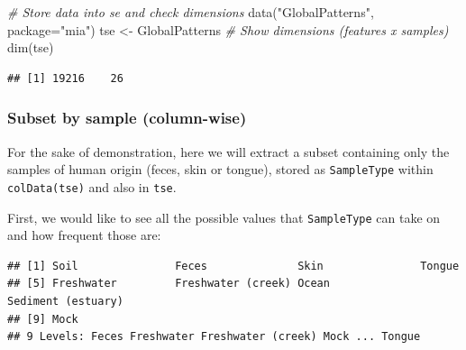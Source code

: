 \documentclass[
]{book}
\newenvironment{Shaded}{\begin{snugshade}}{\end{snugshade}}
\newcommand{\AttributeTok}[1]{\textcolor[rgb]{0.77,0.63,0.00}{#1}}
\newcommand{\CommentTok}[1]{\textcolor[rgb]{0.56,0.35,0.01}{\textit{#1}}}
\newcommand{\FunctionTok}[1]{\textcolor[rgb]{0.00,0.00,0.00}{#1}}
\newcommand{\NormalTok}[1]{#1}
\newcommand{\OtherTok}[1]{\textcolor[rgb]{0.56,0.35,0.01}{#1}}
\newcommand{\SpecialCharTok}[1]{\textcolor[rgb]{0.00,0.00,0.00}{#1}}
\newcommand{\StringTok}[1]{\textcolor[rgb]{0.31,0.60,0.02}{#1}}
\begin{document}
\begin{Shaded}
\begin{Highlighting}[]
\CommentTok{\# Store data into se and check dimensions}
\FunctionTok{data}\NormalTok{(}\StringTok{"GlobalPatterns"}\NormalTok{, }\AttributeTok{package=}\StringTok{"mia"}\NormalTok{)}
\NormalTok{tse }\OtherTok{\textless{}{-}}\NormalTok{ GlobalPatterns}
\CommentTok{\# Show dimensions (features x samples)}
\FunctionTok{dim}\NormalTok{(tse) }
\end{Highlighting}
\end{Shaded}

\begin{verbatim}
## [1] 19216    26
\end{verbatim}

\hypertarget{subset-by-sample-column-wise}{%
\subsubsection{Subset by sample (column-wise)}\label{subset-by-sample-column-wise}}

For the sake of demonstration, here we will extract a subset containing only the samples of human origin (feces, skin or tongue), stored as \texttt{SampleType} within \texttt{colData(tse)} and also in \texttt{tse}.

First, we would like to see all the possible values that \texttt{SampleType} can take on and how frequent those are:

\begin{Shaded}
\end{Shaded}

\begin{verbatim}
## [1] Soil               Feces              Skin               Tongue            
## [5] Freshwater         Freshwater (creek) Ocean              Sediment (estuary)
## [9] Mock              
## 9 Levels: Feces Freshwater Freshwater (creek) Mock ... Tongue
\end{verbatim}

\begin{Shaded}
\end{Shaded}
\end{document}
